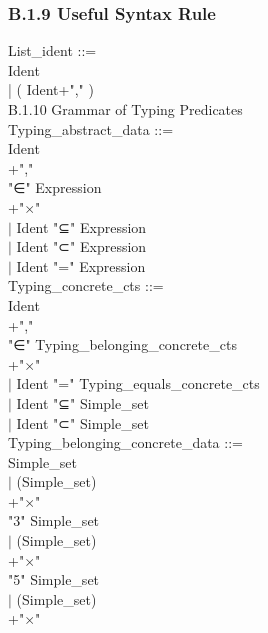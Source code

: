 \documentclass[12pt,a4paper,draft]{report}
\begin{document}
{\begin{sloppypar}
\subsubsection{B.1.9 Useful Syntax Rule} 
List\_ident ::=\\ 
Ident\\ 
|  ( Ident+"," )\\ 
B.1.10 Grammar of Typing Predicates \\ 
Typing\_abstract\_data ::= \\ 
  Ident\\ 
+","\\ 
  "∈"  Expression\\ 
+"$\times$"\\ 
\hspace*{0.20in} $|$ Ident  "⊆"  Expression\\ 
\hspace*{0.20in} $|$ Ident  "⊂"  Expression\\ 
\hspace*{0.20in} $|$ Ident  "="  Expression \\ 
Typing\_concrete\_cts ::= \\ 
  Ident\\ 
+","\\ 
  "∈"  Typing\_belonging\_concrete\_cts\\ 
+"$\times$"\\ 
\hspace*{0.20in} $|$ Ident  "="  Typing\_equals\_concrete\_cts  \\ 
\hspace*{0.20in} $|$ Ident  "⊆"  Simple\_set  \\ 
\hspace*{0.20in} $|$ Ident  "⊂"  Simple\_set\\ 
Typing\_belonging\_concrete\_data ::= \\ 
   Simple\_set\\ 
\hspace*{0.20in} $|$ (Simple\_set)\\ 
+"$\times$"\\ 
  "3"  Simple\_set  \\ 
\hspace*{0.20in} $|$ (Simple\_set)\\ 
+"$\times$"\\ 
  "5"  Simple\_set  \\ 
\hspace*{0.20in} $|$ (Simple\_set)\\ 
+"$\times$"\\ 

\end{sloppypar}}
\end{document}
